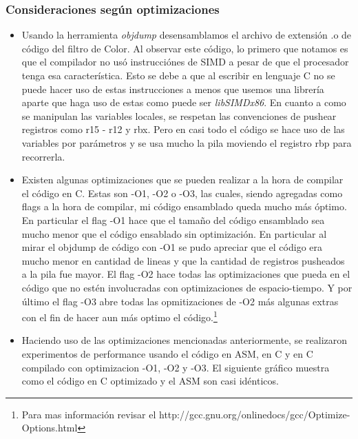 \subsubsection{Consideraciones seg\'un optimizaciones}
\begin{itemize}
 \item Usando la herramienta \emph{objdump} desensamblamos el archivo de extensi\'on .o de c\'odigo del filtro de Color. Al observar este c\'odigo, lo primero que notamos es
 que el compilador no us\'o instrucci\'ones de SIMD a pesar de que el procesador tenga esa caracter\'istica. Esto se debe a que al escribir en lenguaje C
no se puede hacer uso de estas instrucciones a menos que usemos una librer\'ia aparte que haga uso de estas como puede ser \emph{libSIMDx86}.\newline
En cuanto a como se manipulan las variables locales, se respetan las convenciones de pushear registros como r15 - r12 y rbx. Pero en casi todo el c\'odigo
se hace uso de las variables por par\'ametros y se usa mucho la pila moviendo el registro rbp para recorrerla.\newline
\item Existen algunas optimizaciones que se pueden realizar a la hora de compilar el c\'odigo en C. Estas son -O1, -O2 o -O3, las cuales, siendo agregadas
como flags a la hora de compilar, mi c\'odigo ensamblado queda mucho m\'as \'optimo. En particular el flag -O1 hace que el tamaño del c\'odigo ensamblado
sea mucho menor que el c\'odigo ensablado sin optimizaci\'on. En particular al mirar el objdump de c\'odigo con -O1 se pudo apreciar que el c\'odigo era
mucho menor en cantidad de lineas y que la cantidad de registros pusheados a la pila fue mayor.\newline
El flag -O2 hace todas las optimizaciones que pueda en el c\'odigo que no est\'en involucradas con optimizaciones de espacio-tiempo. Y por \'ultimo el flag
-O3 abre todas las opmitizaciones de -O2 m\'as algunas extras con el fin de hacer aun m\'as optimo el c\'odigo.\footnote{Para mas informaci\'on revisar el
http://gcc.gnu.org/onlinedocs/gcc/Optimize-Options.html}\newline
\item Haciendo uso de las optimizaciones mencionadas anteriormente, se realizaron experimentos de performance usando el c\'odigo en ASM, en C y en C 
compilado con optimizacion -O1, -O2 y -O3. El siguiente gr\'afico muestra como el c\'odigo en C optimizado y el ASM son casi id\'enticos.


\end{itemize}
